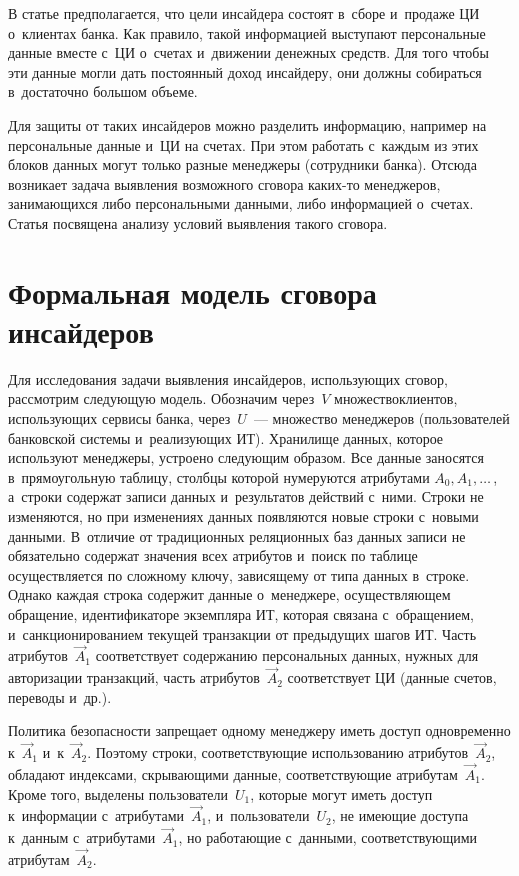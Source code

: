 \begin{multicols}{2}
  В статье предполагается, что цели инсайдера состоят в~сборе и~продаже ЦИ
   о~клиентах банка. Как правило, такой информацией выступают 
персональные данные вместе с~ЦИ о~счетах и~движении 
денежных средств. Для того чтобы эти данные могли дать постоянный доход 
инсайдеру, они должны собираться в~достаточно большом объеме. 
{

}
  
  Для защиты от таких инсайдеров можно разделить информацию, например на 
персональные данные и~ЦИ на счетах. При этом работать 
с~каж\-дым из этих блоков данных могут только разные менеджеры (сотрудники 
банка). Отсюда возникает задача выявления возможного сговора ка\-ких-то 
менеджеров, занимающихся либо персональными данными, либо информацией 
о~счетах.  Статья посвящена анализу условий выявления такого сго\-вора.
  
  \section{Формальная модель сговора инсайдеров}
  
  Для исследования задачи выявления инсайдеров, использующих сговор, 
рассмотрим сле\-ду\-ющую модель. Обозначим через~$V$ множество\linebreak клиентов, 
использующих сервисы банка, через~$U$~--- множество менеджеров 
(пользователей банковской сис\-те\-мы и~реализующих ИТ). Хранилище данных, 
которое используют менеджеры, устроено сле\-ду\-ющим 
образом. Все данные заносятся в~прямоугольную таб\-ли\-цу, столб\-цы которой 
нумеруются атрибутами $A_0, A_1,\ldots$\,, а~строки содержат записи данных 
и~результатов действий с~ними. Строки не изменяются, но при изменениях 
данных появляются новые строки с~новыми данными. В~отличие от 
традиционных реляционных баз данных записи не обязательно содержат 
значения всех атрибутов и~поиск по таб\-ли\-це осуществляется по сложному 
ключу, зависящему от типа данных в~строке. Однако каждая строка содержит 
данные о~ме\-нед\-же\-ре, осуществляющем обращение, идентификаторе экземпляра 
ИТ, которая связана с~обращением, и~санкционированием текущей транзакции от 
предыдущих шагов ИТ. Часть атрибутов~$\vec{A}_1$ соответствует содержанию 
персональных данных, нужных для авторизации транзакций, часть 
атрибутов~$\vec{A}_2$ соответствует ЦИ (данные счетов, 
переводы и~др.).  
  
  Политика безопасности запрещает одному менеджеру иметь доступ 
одновременно к~$\vec{A}_1$ и~к~$\vec{A}_2$. Поэтому строки, 
соответствующие использованию атрибутов~$\vec{A}_2$, обладают индексами, 
скрывающими данные, соответствующие атрибутам~$\vec{A}_1$. Кроме того, 
выделены пользователи~$U_1$, которые могут иметь доступ к~информации 
с~атрибутами~$\vec{A}_1$, и~пользователи~$U_2$, не имеющие доступа 
к~данным с~атрибутами~$\vec{A}_1$, но работающие с~данными, 
соответствующими атрибутам~$\vec{A}_2$.
  

\end{multicols}
